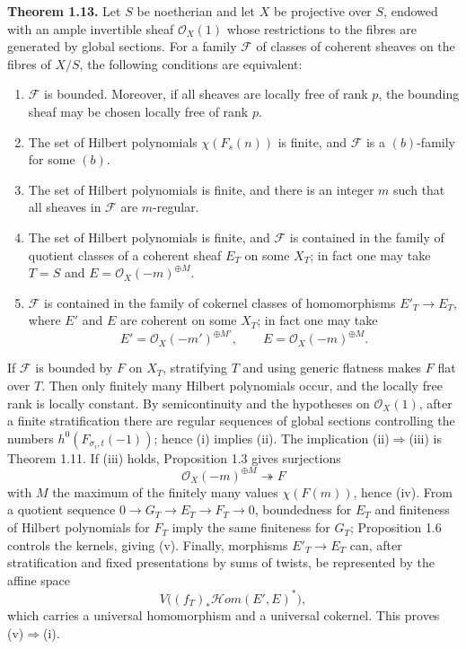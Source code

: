 \documentclass[11pt]{article}
\begin{document}
\textbf{Theorem 1.13.} Let $S$ be noetherian and let $X$ be projective over $S$, endowed with an ample invertible sheaf $\mathcal O_X(1)$ whose restrictions to the fibres are generated by global sections. For a family $\mathcal F$ of classes of coherent sheaves on the fibres of $X/S$, the following conditions are equivalent:
\begin{enumerate}[label=\roman*)]
\item $\mathcal F$ is bounded. Moreover, if all sheaves are locally free of rank $p$, the bounding sheaf may be chosen locally free of rank $p$.
\item The set of Hilbert polynomials $\chi(F_s(n))$ is finite, and $\mathcal F$ is a $(b)$-family for some $(b)$.
\item The set of Hilbert polynomials is finite, and there is an integer $m$ such that all sheaves in $\mathcal F$ are $m$-regular.
\item The set of Hilbert polynomials is finite, and $\mathcal F$ is contained in the family of quotient classes of a coherent sheaf $E_T$ on some $X_T$; in fact one may take $T=S$ and $E=\mathcal O_X(-m)^{\oplus M}$.
\item $\mathcal F$ is contained in the family of cokernel classes of homomorphisms $E'_T\to E_T$, where $E'$ and $E$ are coherent on some $X_T$; in fact one may take
\[
 E'=\mathcal O_X(-m')^{\oplus M'},\qquad E=\mathcal O_X(-m)^{\oplus M}.
\]
\end{enumerate}

If $\mathcal F$ is bounded by $F$ on $X_T$, stratifying $T$ and using generic flatness makes $F$ flat over $T$. Then only finitely many Hilbert polynomials occur, and the locally free rank is locally constant. By semicontinuity and the hypotheses on $\mathcal O_X(1)$, after a finite stratification there are regular sequences of global sections controlling the numbers $h^0(F_{\sigma_i,t}(-1))$; hence (i) implies (ii). The implication (ii)$\Rightarrow$(iii) is Theorem 1.11. If (iii) holds, Proposition 1.3 gives surjections
\[
 \mathcal O_X(-m)^{\oplus M}\twoheadrightarrow F
\]
with $M$ the maximum of the finitely many values $\chi(F(m))$, hence (iv). From a quotient sequence $0\to G_T\to E_T\to F_T\to0$, boundedness for $E_T$ and finiteness of Hilbert polynomials for $F_T$ imply the same finiteness for $G_T$; Proposition 1.6 controls the kernels, giving (v). Finally, morphisms $E'_T\to E_T$ can, after stratification and fixed presentations by sums of twists, be represented by the affine space
\[
 V\bigl((f_T)_*\mathcal H\!om(E',E)^*\bigr),
\]
which carries a universal homomorphism and a universal cokernel. This proves (v)$\Rightarrow$(i).
\end{document}
